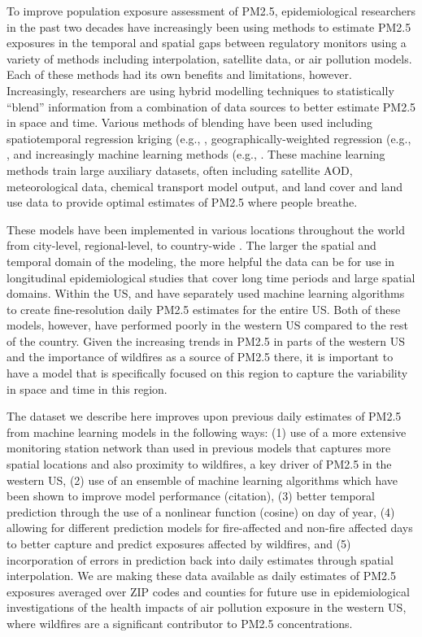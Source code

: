 \documentclass[english]{article}
\begin{document}
To improve population exposure assessment of PM2.5, epidemiological researchers in the past two decades have increasingly been using methods to estimate PM2.5 exposures in the temporal and spatial gaps between regulatory monitors using a variety of methods including interpolation, satellite data, or air pollution models. Each of these methods had its own benefits and limitations, however. Increasingly, researchers are using hybrid modelling techniques to statistically “blend” information from a combination of data sources to better estimate PM2.5 in space and time. Various methods of blending have been used including spatiotemporal regression kriging (e.g., \cite{hu_satellite-based_2019}, geographically-weighted regression (e.g., \cite{lassman_spatial_2017}, and increasingly machine learning methods (e.g., \cite{reid_spatiotemporal_2015, hu_estimating_2017, di_assessing_2016}. These machine learning methods train large auxiliary datasets, often including satellite AOD, meteorological data, chemical transport model output, and land cover and land use data to provide optimal estimates of PM2.5 where people breathe. 

These models have been implemented in various locations throughout the world from city-level, regional-level, to country-wide \cite{bellinger_systematic_2017}. The larger the spatial and temporal domain of the modeling, the more helpful the data can be for use in longitudinal epidemiological studies that cover long time periods and large spatial domains. Within the US, \cite{di_assessing_2016} and \cite{hu_estimating_2017} have separately used machine learning algorithms to create fine-resolution daily PM2.5 estimates for the entire US. Both of these models, however, have performed poorly in the western US compared to the rest of the country. Given the increasing trends in PM2.5 in parts of the western US and the importance of wildfires as a source of PM2.5 there, it is important to have a model that is specifically focused on this region to capture the variability in space and time in this region. 

	The dataset we describe here improves upon previous daily estimates of PM2.5 from machine learning models in the following ways: (1) use of a more extensive monitoring station network than used in previous models that captures more spatial locations and also proximity to wildfires, a key driver of PM2.5 in the western US, (2) use of an ensemble of machine learning algorithms which have been shown to improve model performance (citation), (3) better temporal prediction through the use of a nonlinear function (cosine) on day of year, (4) allowing for different prediction models for fire-affected and non-fire affected days to better capture and predict exposures affected by wildfires, and (5) incorporation of errors in prediction back into daily estimates through spatial interpolation. We are making these data available as daily estimates of PM2.5 exposures averaged over ZIP codes and counties for future use in epidemiological investigations of the health impacts of air pollution exposure in the western US, where wildfires are a significant contributor to PM2.5 concentrations. 
\end{document}
